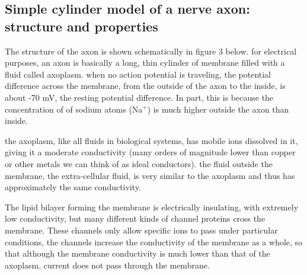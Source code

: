 \subsection*{Simple cylinder model of a nerve axon: structure and properties}
The structure of the axon is shown schematically in figure 3 below.
for electrical purposes, an axon is basically a long, thin cylinder of membrane filled with a fluid called axoplasm.
when no action potential is traveling, the potential difference across the membrane, from the outside of the axon to the inside, is about -70 mV, the resting potential difference.
In part, this is because the concentration of of sodium atoms (Na$^{+}$) is much higher outside the axon than inside.
\par
the axoplasm, like all fluids in biological systems, has mobile ions dissolved in it, giving it a moderate conductivity (many orders of magnitude lower than copper or other metals we can think of as ideal conductors).
the fluid outside the membrane, the extra-cellular fluid, is very similar to the axoplasm and thus has approximately the same conductivity.
\par 
The lipid bilayer forming the membrane is electrically insulating, with extremely low conductivity, but many different kinds of channel proteins cross the membrane.
These channels only allow specific ions to pass under particular conditions,
the channels increase the conductivity of the membrane as a whole, so that although the membrane conductivity is much lower than that of the axoplasm, current does not pass through the membrane.

